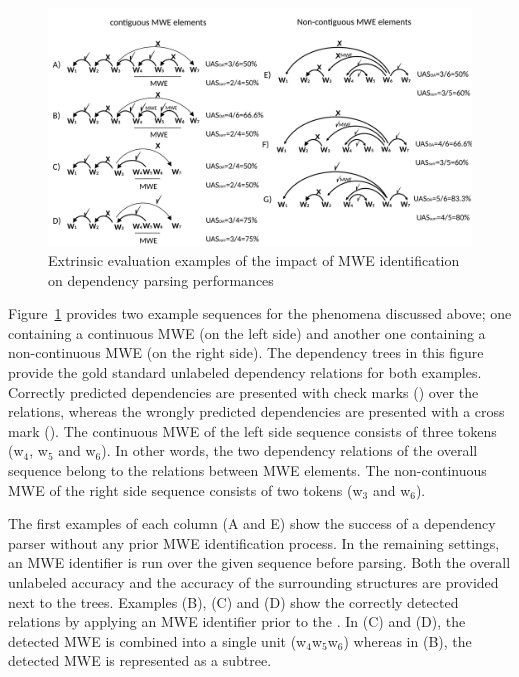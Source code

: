 \documentclass[output=paper]{langsci/langscibook}
\begin{document}
\begin{figure}[htbp]
  \centering
      \includegraphics[width=1.00\textwidth]{figures/Presentation1}
    \caption{Extrinsic evaluation examples of the impact of MWE identification on dependency parsing performances}
	\label{con:fig:example}
\end{figure}


Figure~\ref{con:fig:example} provides two example sequences for the phenomena discussed above; one containing a continuous MWE (on the left side)  and another one containing a non-continuous MWE (on the right side).
The dependency trees in this figure provide the gold standard unlabeled dependency relations for both examples.
Correctly predicted dependencies %
are presented with check marks () over the relations, whereas the wrongly predicted dependencies are presented with a cross mark (). 
The continuous MWE of the left side sequence consists of three tokens (w$_4$, w$_5$ and w$_6$). In other words, the two dependency relations of the overall sequence belong to the relations between MWE elements. The non-continuous MWE of the right side sequence consists of two tokens (w$_3$ and w$_6$).

The first examples of each column (A and E) show the success of a dependency parser without any prior MWE identification process. 
In the remaining settings, an MWE identifier is run over the given sequence before parsing.
Both the overall unlabeled accuracy \asuo{} and the accuracy of the surrounding structures \asus{} are provided next to the trees. Examples (B), (C) and (D) show the correctly detected relations by applying an MWE identifier prior to the . In (C) and (D), the detected MWE is combined into a single unit (w$_4$w$_5$w$_6$) whereas in (B), the detected MWE is represented as a subtree. %
\end{document}
